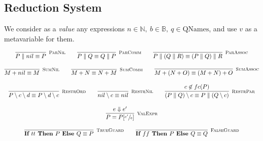 \subsection{Reduction System}

We consider as a \textit{value} any expressions $n \in \mathbb{N},\  b \in \mathbb{B},\  q \in  \text{QNames}$, and use $v$ as a metavariable for them.

	\begin{gather*}
    \infer[\mbox{\footnotesize\scshape ParNil}]{P \parallel nil \equiv P}{} \qquad
    \infer[\mbox{\footnotesize\scshape ParComm}]{P \parallel Q \equiv Q \parallel P}{} \qquad
    \infer[\mbox{\footnotesize\scshape ParAssoc}]{P \parallel (Q \parallel R) \equiv (P \parallel Q) \parallel R}{} 
    \\[0.3cm]
    \infer[\mbox{\footnotesize\scshape SumNil}]{M + nil \equiv M}{} \qquad
    \infer[\mbox{\footnotesize\scshape SumComm}]{M + N \equiv N + M}{} \qquad
    \infer[\mbox{\footnotesize\scshape SumAssoc}]{M + (N + O) \equiv (M + N) + O}{} 
    \\[0.3cm]
    \infer[\mbox{\footnotesize\scshape RestrOrd}]{P \setminus c \setminus d \equiv P \setminus d \setminus c}{} \qquad 
    \infer[\mbox{\footnotesize\scshape RestrNil}]{nil \setminus c \equiv nil}{} \qquad 
    \infer[\mbox{\footnotesize\scshape RestrPar}]{(P \parallel Q) \setminus c \equiv P \parallel (Q \setminus c)}{c \not\in fc(P)} \\[0.3cm]
    \infer[\mbox{\footnotesize\scshape ValExpr}]{ P \equiv P[\sfrac{e'}{e}] }{e \Downarrow e'} \\[0.3cm]
    \infer[\mbox{\footnotesize\scshape TrueGuard}]{\ITE{tt}{P}{Q} \equiv P}{} \qquad
    \infer[\mbox{\footnotesize\scshape FalseGuard}]{\ITE{ff}{P}{Q} \equiv Q}{} 
	\end{gather*}	


